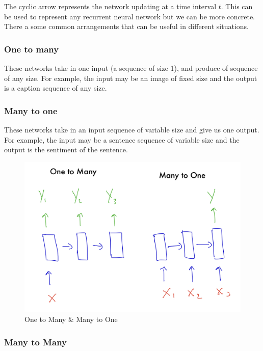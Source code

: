 \documentclass[
]{article}
\begin{document}
The cyclic arrow represents the network updating at a time interval \(t\). This can be used to represent any recurrent neural network but we can be more concrete. There a some common arrangements that can be useful in different situations.

\subsubsection{One to many}\label{one-to-many}

These networks take in one input (a sequence of size 1), and produce of sequence of any size. For example, the input may be an image of fixed size and the output is a caption sequence of any size.

\subsubsection{Many to one}\label{many-to-one}

These networks take in an input sequence of variable size and give us one output. For example, the input may be a sentence sequence of variable size and the output is the sentiment of the sentence.

\begin{figure}
\centering
\includegraphics{images/IMG_0012.jpg}
\caption{One to Many \& Many to One}
\end{figure}

\subsubsection{Many to Many}\label{many-to-many}
\end{document}

